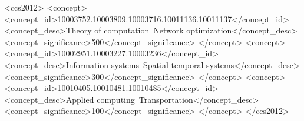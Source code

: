 \documentclass[sigconf]{acmart}
\begin{document}
\begin{CCSXML}
<ccs2012>
   <concept>
       <concept_id>10003752.10003809.10003716.10011136.10011137</concept_id>
       <concept_desc>Theory of computation~Network optimization</concept_desc>
       <concept_significance>500</concept_significance>
   </concept>
   <concept>
       <concept_id>10002951.10003227.10003236</concept_id>
       <concept_desc>Information systems~Spatial-temporal systems</concept_desc>
       <concept_significance>300</concept_significance>
   </concept>
   <concept>
       <concept_id>10010405.10010481.10010485</concept_id>
       <concept_desc>Applied computing~Transportation</concept_desc>
       <concept_significance>100</concept_significance>
   </concept>
</ccs2012>
\end{CCSXML}

\newcommand{\Eunus}[1]{\textcolor{purple}{\textsc{Eunus:} #1 }}

\maketitle
\end{document}
